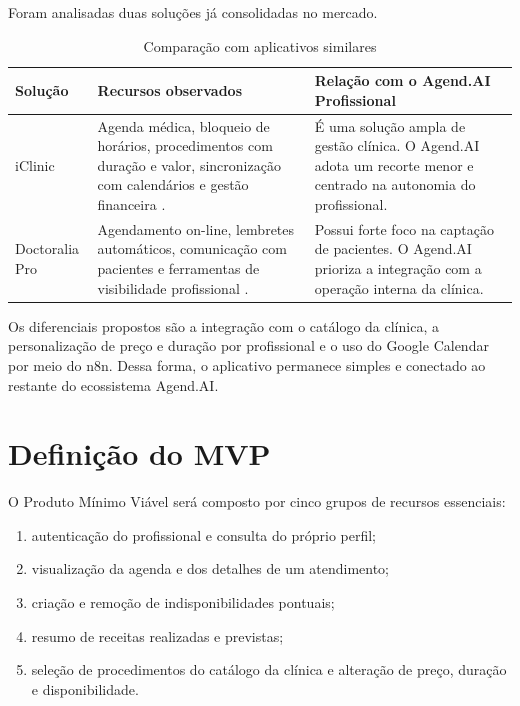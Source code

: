 \documentclass[
  12pt,
  openright,
  oneside,
  a4paper,
  english,
  brazil
]{abntex2}
\begin{document}
Foram analisadas duas soluções já consolidadas no mercado.

\begin{table}[H]
\centering
\caption{Comparação com aplicativos similares}
\small
\begin{tabularx}{\textwidth}{p{2.4cm}YY}
\toprule
\textbf{Solução} & \textbf{Recursos observados} & \textbf{Relação com o Agend.AI Profissional} \\
\midrule
iClinic & Agenda médica, bloqueio de horários, procedimentos com duração e valor, sincronização com calendários e gestão financeira \cite{iclinic2026}. & É uma solução ampla de gestão clínica. O Agend.AI adota um recorte menor e centrado na autonomia do profissional. \\
\addlinespace
Doctoralia Pro & Agendamento on-line, lembretes automáticos, comunicação com pacientes e ferramentas de visibilidade profissional \cite{doctoralia2026}. & Possui forte foco na captação de pacientes. O Agend.AI prioriza a integração com a operação interna da clínica. \\
\bottomrule
\end{tabularx}
\end{table}

Os diferenciais propostos são a integração com o catálogo da clínica, a personalização de preço e duração por profissional e o uso do Google Calendar por meio do n8n. Dessa forma, o aplicativo permanece simples e conectado ao restante do ecossistema Agend.AI.

\section{Definição do MVP}

O Produto Mínimo Viável será composto por cinco grupos de recursos essenciais:

\begin{enumerate}[label=\arabic*.]
  \item autenticação do profissional e consulta do próprio perfil;
  \item visualização da agenda e dos detalhes de um atendimento;
  \item criação e remoção de indisponibilidades pontuais;
  \item resumo de receitas realizadas e previstas;
  \item seleção de procedimentos do catálogo da clínica e alteração de preço, duração e disponibilidade.
\end{enumerate}
\end{document}
